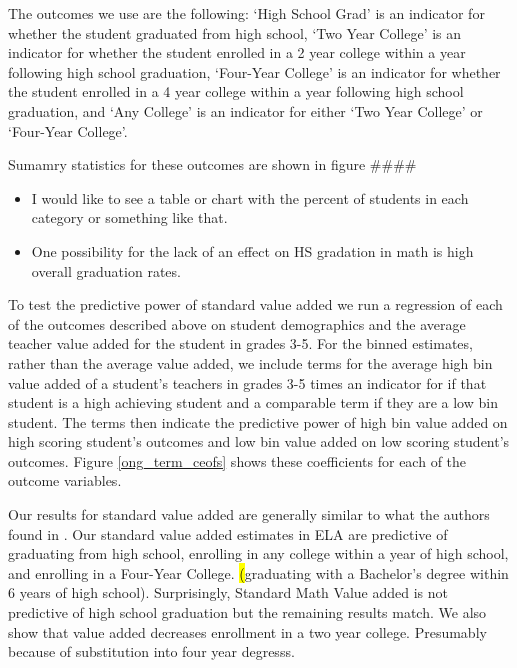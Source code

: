 \documentclass{article}
\theoremstyle{definition}
\theoremstyle{definition}
\theoremstyle{definition}
\theoremstyle{definition}
\begin{document}
The outcomes we use are the following: `High School Grad' is an indicator for whether the student graduated from high school, `Two Year College' is an indicator for whether the student enrolled in a 2 year college within a year following high school graduation, `Four-Year College' is an indicator for whether the student enrolled in a 4 year college within a year following high school graduation, and `Any College' is an indicator for either `Two Year College' or `Four-Year College'. 

Sumamry statistics for these outcomes are shown in figure #### 
\begin{itemize}
    \item I would like to see a table or chart with the percent of students in each category or something like that. 
    \item One possibility for the lack of an effect on HS gradation in math is high overall graduation rates. 
\end{itemize}

To test the predictive power of standard value added we run a regression of each of the outcomes described above on student demographics and the average teacher value added for the student in grades 3-5. For the binned estimates, rather than the average value added, we include terms for the average high bin value added of a student's teachers in grades 3-5 times an indicator for if that student is a high achieving student and a comparable term if they are a low bin student. The terms then indicate the predictive power of high bin value added on high scoring student's outcomes and low bin value added on low scoring student's outcomes. Figure \ref{ong_term_ceofs} shows these coefficients for each of the outcome variables. 


Our results for standard value added are generally similar to what the authors found in \cite{chetty2014measuring2}. Our standard value added estimates in ELA are predictive of graduating from high school, enrolling in any college within a year of high school, and  enrolling in a Four-Year College. \hl(graduating with a Bachelor's degree within 6 years of high school). Surprisingly, Standard Math Value added is not predictive of high school graduation but the remaining results match. We also show that value added decreases enrollment in a two year college. Presumably because of substitution into four year degresss. 
\end{document}
